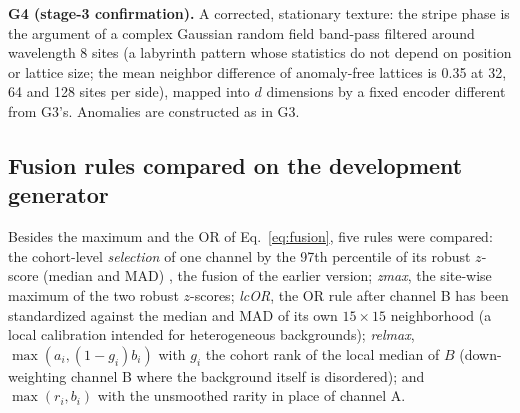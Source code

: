 \documentclass[preprint,review,12pt]{elsarticle}
\begin{document}
\textbf{G4 (stage-3 confirmation).} A corrected, stationary texture: the stripe phase is the argument of a complex Gaussian random field band-pass filtered around wavelength 8 sites (a labyrinth pattern whose statistics do not depend on position or lattice size; the mean neighbor difference of anomaly-free lattices is 0.35 at 32, 64 and 128 sites per side), mapped into $d$ dimensions by a fixed encoder different from G3's. Anomalies are constructed as in G3.

\begin{table}[t]
\caption{The generators and their role.}
\label{tab:gen}
\centering\footnotesize
{}
\end{table}

\subsection{Fusion rules compared on the development generator}
Besides the maximum and the OR of Eq.~\eqref{eq:fusion}, five rules were compared: the cohort-level \emph{selection} of one channel by the 97th percentile of its robust $z$-score (median and MAD) \citep{Rousseeuw1993}, the fusion of the earlier version; \emph{zmax}, the site-wise maximum of the two robust $z$-scores; \emph{lcOR}, the OR rule after channel B has been standardized against the median and MAD of its own $15\times15$ neighborhood (a local calibration intended for heterogeneous backgrounds); \emph{relmax}, $\max(a_i,(1-g_i)b_i)$ with $g_i$ the cohort rank of the local median of $B$ (down-weighting channel B where the background itself is disordered); and $\max(r_i,b_i)$ with the unsmoothed rarity in place of channel A.
\end{document}
